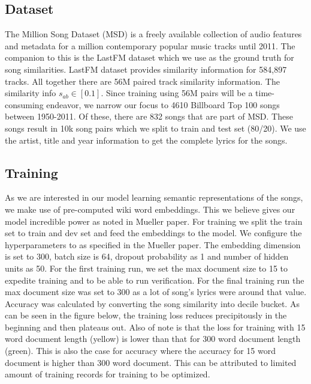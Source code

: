 \documentclass[11pt]{article}
\begin{document}
\subsection{Dataset}
The Million Song Dataset (MSD) is a freely available collection of audio 
features and metadata for a million contemporary popular music tracks until
2011. The companion to this is the LastFM dataset which we use as the ground
truth for song similarities. LastFM dataset provides similarity information
for 584,897 tracks. All together there are 56M paired track similarity
information. The similarity info $s_{ab} \in [0.1]$. Since training 
using 56M pairs will be a time-consuming endeavor, we narrow our focus to 4610
Billboard Top 100 songs between 1950-2011. Of these, there are 832 songs
that are part of MSD. These songs result in 10k song pairs which we split 
to train and test set (80/20). We use the artist, title and year information
to get the complete lyrics for the songs.

\subsection{Training}
As we are interested in our model learning semantic representations of 
the songs, we make use of pre-computed wiki word embeddings. This we believe
gives our model incredible power as noted in Mueller paper. For training we 
split the train set to train and dev set and feed the embeddings to the model.
We configure the hyperparameters to as specified in the Mueller paper. The
embedding dimension is set to 300, batch size is 64, dropout probability as 1
and number of hidden units as 50. For the first training run, we set the
max document size to 15 to expedite training and to be able to run verification.
For the final training run the max document size was set to 300 as a lot of 
song's lyrics were around that value. Accuracy was calculated by converting the 
song similarity into decile bucket. As can be seen in the figure below,
the training loss reduces precipitously in the beginning and then plateaus out.
Also of note is that the loss for training with 15 word document length (yellow) is
lower than that for 300 word document length (green). This is also the case for
accuracy where the accuracy for 15 word document is higher than 300 word
document. This can be attributed to limited amount of training records
for training to be optimized.
\end{document}
